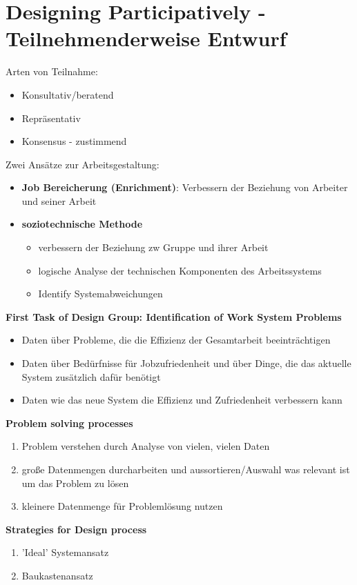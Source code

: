 \section{Designing Participatively - Teilnehmenderweise Entwurf}
Arten von Teilnahme:
\begin{itemize}
	\item Konsultativ/beratend
	\item Repräsentativ
	\item Konsensus - zustimmend
\end{itemize}
Zwei Ansätze zur Arbeitsgestaltung:
\begin{itemize}
	\item \textbf{Job Bereicherung (Enrichment)}: Verbessern der Beziehung von Arbeiter und seiner Arbeit
	\item \textbf{soziotechnische Methode}
	\begin{itemize}
		\item verbessern der Beziehung zw Gruppe und ihrer Arbeit
		\item logische Analyse der technischen Komponenten des Arbeitssystems
		\item Identify Systemabweichungen
	\end{itemize}
\end{itemize}

\textbf{First Task of Design Group: Identification of Work System Problems}
\begin{itemize}
	\item Daten über Probleme, die die Effizienz der Gesamtarbeit beeinträchtigen
	\item Daten über Bedürfnisse für Jobzufriedenheit und über Dinge, die das aktuelle System zusätzlich dafür benötigt
	\item Daten wie das neue System die Effizienz und Zufriedenheit verbessern kann
\end{itemize}

\textbf{Problem solving processes}
\begin{enumerate}
	\item Problem verstehen durch Analyse von vielen, vielen Daten
	\item große Datenmengen durcharbeiten und aussortieren/Auswahl was relevant ist um das Problem zu lösen
	\item kleinere Datenmenge für Problemlösung nutzen
\end{enumerate}

\textbf{Strategies for Design process}
\begin{enumerate}
	\item 'Ideal' Systemansatz
	\item Baukastenansatz
\end{enumerate}

